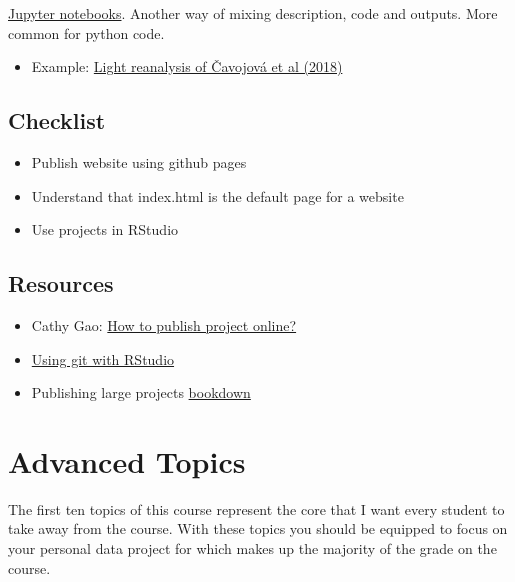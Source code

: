 \documentclass[
]{book}
\providecommand{\tightlist}{%
  \setlength{\itemsep}{0pt}\setlength{\parskip}{0pt}}
\begin{document}
\href{https://jupyter.org/}{Jupyter notebooks}. Another way of mixing description, code and outputs. More common for python code.

\begin{itemize}
\tightlist
\item
  Example: \href{https://github.com/tomstafford/cavojova2018/blob/master/cavojava_reanalysis.ipynb}{Light reanalysis of Čavojová et al (2018)}
\end{itemize}

\hypertarget{checklist-8}{%
\section{Checklist}\label{checklist-8}}

\begin{itemize}
\tightlist
\item
  Publish website using github pages
\item
  Understand that index.html is the default page for a website
\item
  Use projects in RStudio
\end{itemize}

\hypertarget{resources-9}{%
\section{Resources}\label{resources-9}}

\begin{itemize}
\tightlist
\item
  Cathy Gao: \href{https://rpubs.com/cathydatascience/518692}{How to publish project online?}
\item
  \href{https://support.rstudio.com/hc/en-us/articles/200532077-Version-Control-with-Git-and-SVN}{Using git with RStudio}
\item
  Publishing large projects \href{https://www.bookdown.org/}{bookdown}
\end{itemize}

\hypertarget{advanced-topics}{%
\chapter*{Advanced Topics}\label{advanced-topics}}


The first ten topics of this course represent the core that I want every student to take away from the course. With these topics you should be equipped to focus on your personal data project for which makes up the majority of the grade on the course.
\end{document}
